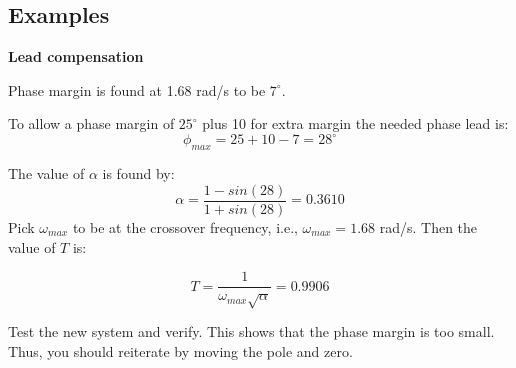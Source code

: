 \subsection{Examples}

\textbf{Lead compensation}

Phase margin is found at 1.68 rad/s to be $7^\circ$.

To allow a phase margin of $25^\circ$ plus 10 for extra margin the needed phase lead is:
$$\phi_{max} = 25 + 10 - 7 = 28^\circ$$

The value of $\alpha$ is found by:
$$\alpha = \frac{1-sin(28)}{1+sin(28)} = 0.3610$$
Pick $\omega_{max}$ to be at the crossover frequency, i.e., $\omega_{max} = 1.68$ rad/s.
Then the value of $T$ is:

$$T = \frac{1}{\omega_{max}\sqrt{\alpha}} = 0.9906$$

Test the new system and verify. This shows that the phase margin is too small. Thus, you should reiterate by moving
the pole and zero.
